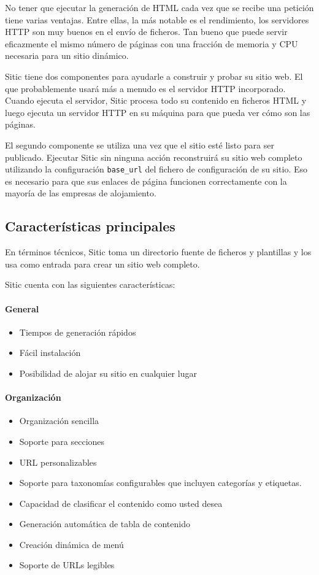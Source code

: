 No tener que ejecutar la generación de HTML cada vez que se recibe una petición tiene varias ventajas. Entre ellas,
la más notable es el rendimiento, los servidores HTTP son muy buenos en el envío de ficheros. Tan bueno que puede
servir eficazmente el mismo número de páginas con una fracción de memoria y CPU necesaria para un sitio dinámico.

Sitic tiene dos componentes para ayudarle a construir y probar su sitio web. El que probablemente usará más a menudo es el
servidor HTTP incorporado. Cuando ejecuta el servidor, Sitic procesa todo su contenido en ficheros HTML y luego ejecuta
un servidor HTTP en su máquina para que pueda ver cómo son las páginas.

El segundo componente se utiliza una vez que el sitio esté listo para ser publicado.
Ejecutar Sitic sin ninguna acción reconstruirá su sitio web completo utilizando la configuración \texttt{base\_url}
del fichero de configuración de su sitio. Eso es necesario para que sus enlaces de página funcionen correctamente
con la mayoría de las empresas de alojamiento.

\subsection{Características principales}

En términos técnicos, Sitic toma un directorio fuente de ficheros
y plantillas y los usa como entrada para crear un sitio web completo.

Sitic cuenta con las siguientes características:

\paragraph{General}

\begin{itemize}
\item Tiempos de generación rápidos
\item Fácil instalación
\item Posibilidad de alojar su sitio en cualquier lugar
\end{itemize}

\paragraph{Organización}

\begin{itemize}
\item Organización sencilla
\item Soporte para secciones
\item URL personalizables
\item Soporte para taxonomías configurables que incluyen categorías y etiquetas.
\item Capacidad de clasificar el contenido como usted desea
\item Generación automática de tabla de contenido
\item Creación dinámica de menú
\item Soporte de URLs legibles
\end{itemize}

